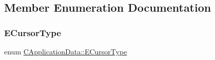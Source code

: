 \subsection{Member Enumeration Documentation}
\hypertarget{classCApplicationData_ad024b66b60017c45c47a85dbc636ae69}{}\label{classCApplicationData_ad024b66b60017c45c47a85dbc636ae69} 
\subsubsection{\texorpdfstring{E\+Cursor\+Type}{ECursorType}}
{\footnotesize\ttfamily enum \hyperlink{classCApplicationData_ad024b66b60017c45c47a85dbc636ae69}{C\+Application\+Data\+::\+E\+Cursor\+Type}\hspace{0.3cm}{\ttfamily [protected]}}

